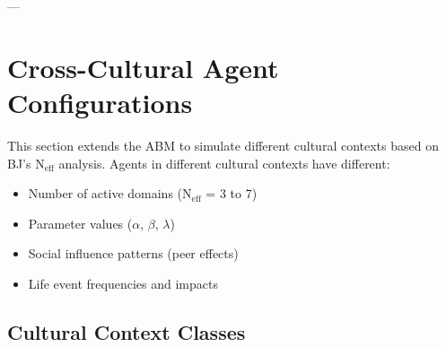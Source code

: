 ---


\section{Cross-Cultural Agent Configurations}
\label{ppp:crosscultural}

\begin{tcolorbox}[colback=orange!5!white, colframe=orange!75!black, title=Connection to Appendix UNMAPPED_BJ]
This section extends the ABM to simulate different cultural contexts based on BJ's
N$_{\text{eff}}$ analysis. Agents in different cultural contexts have different:
\begin{itemize}[nosep]
\item Number of active domains (N$_{\text{eff}}$ = 3 to 7)
\item Parameter values ($\alpha$, $\beta$, $\lambda$)
\item Social influence patterns (peer effects)
\item Life event frequencies and impacts
\end{itemize}
\end{tcolorbox}

\subsection{Cultural Context Classes}

